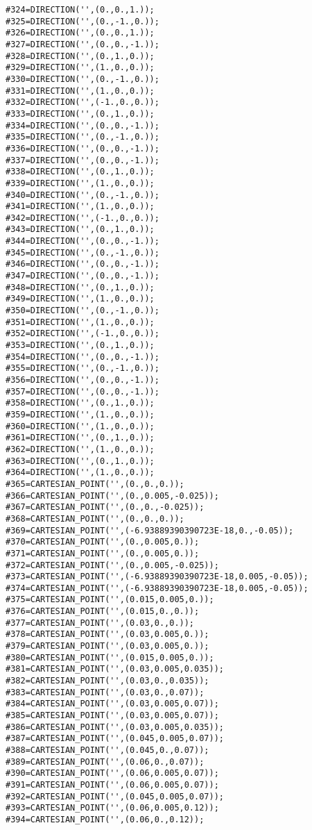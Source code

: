 \documentclass[a4paper,12pt]{article}
\begin{document}
\begin{lstlising}[language=C++]
\begin{lstlisting}[language=STEP]
#324=DIRECTION('',(0.,0.,1.));
#325=DIRECTION('',(0.,-1.,0.));
#326=DIRECTION('',(0.,0.,1.));
#327=DIRECTION('',(0.,0.,-1.));
#328=DIRECTION('',(0.,1.,0.));
#329=DIRECTION('',(1.,0.,0.));
#330=DIRECTION('',(0.,-1.,0.));
#331=DIRECTION('',(1.,0.,0.));
#332=DIRECTION('',(-1.,0.,0.));
#333=DIRECTION('',(0.,1.,0.));
#334=DIRECTION('',(0.,0.,-1.));
#335=DIRECTION('',(0.,-1.,0.));
#336=DIRECTION('',(0.,0.,-1.));
#337=DIRECTION('',(0.,0.,-1.));
#338=DIRECTION('',(0.,1.,0.));
#339=DIRECTION('',(1.,0.,0.));
#340=DIRECTION('',(0.,-1.,0.));
#341=DIRECTION('',(1.,0.,0.));
#342=DIRECTION('',(-1.,0.,0.));
#343=DIRECTION('',(0.,1.,0.));
#344=DIRECTION('',(0.,0.,-1.));
#345=DIRECTION('',(0.,-1.,0.));
#346=DIRECTION('',(0.,0.,-1.));
#347=DIRECTION('',(0.,0.,-1.));
#348=DIRECTION('',(0.,1.,0.));
#349=DIRECTION('',(1.,0.,0.));
#350=DIRECTION('',(0.,-1.,0.));
#351=DIRECTION('',(1.,0.,0.));
#352=DIRECTION('',(-1.,0.,0.));
#353=DIRECTION('',(0.,1.,0.));
#354=DIRECTION('',(0.,0.,-1.));
#355=DIRECTION('',(0.,-1.,0.));
#356=DIRECTION('',(0.,0.,-1.));
#357=DIRECTION('',(0.,0.,-1.));
#358=DIRECTION('',(0.,1.,0.));
#359=DIRECTION('',(1.,0.,0.));
#360=DIRECTION('',(1.,0.,0.));
#361=DIRECTION('',(0.,1.,0.));
#362=DIRECTION('',(1.,0.,0.));
#363=DIRECTION('',(0.,1.,0.));
#364=DIRECTION('',(1.,0.,0.));
#365=CARTESIAN_POINT('',(0.,0.,0.));
#366=CARTESIAN_POINT('',(0.,0.005,-0.025));
#367=CARTESIAN_POINT('',(0.,0.,-0.025));
#368=CARTESIAN_POINT('',(0.,0.,0.));
#369=CARTESIAN_POINT('',(-6.93889390390723E-18,0.,-0.05));
#370=CARTESIAN_POINT('',(0.,0.005,0.));
#371=CARTESIAN_POINT('',(0.,0.005,0.));
#372=CARTESIAN_POINT('',(0.,0.005,-0.025));
#373=CARTESIAN_POINT('',(-6.93889390390723E-18,0.005,-0.05));
#374=CARTESIAN_POINT('',(-6.93889390390723E-18,0.005,-0.05));
#375=CARTESIAN_POINT('',(0.015,0.005,0.));
#376=CARTESIAN_POINT('',(0.015,0.,0.));
#377=CARTESIAN_POINT('',(0.03,0.,0.));
#378=CARTESIAN_POINT('',(0.03,0.005,0.));
#379=CARTESIAN_POINT('',(0.03,0.005,0.));
#380=CARTESIAN_POINT('',(0.015,0.005,0.));
#381=CARTESIAN_POINT('',(0.03,0.005,0.035));
#382=CARTESIAN_POINT('',(0.03,0.,0.035));
#383=CARTESIAN_POINT('',(0.03,0.,0.07));
#384=CARTESIAN_POINT('',(0.03,0.005,0.07));
#385=CARTESIAN_POINT('',(0.03,0.005,0.07));
#386=CARTESIAN_POINT('',(0.03,0.005,0.035));
#387=CARTESIAN_POINT('',(0.045,0.005,0.07));
#388=CARTESIAN_POINT('',(0.045,0.,0.07));
#389=CARTESIAN_POINT('',(0.06,0.,0.07));
#390=CARTESIAN_POINT('',(0.06,0.005,0.07));
#391=CARTESIAN_POINT('',(0.06,0.005,0.07));
#392=CARTESIAN_POINT('',(0.045,0.005,0.07));
#393=CARTESIAN_POINT('',(0.06,0.005,0.12));
#394=CARTESIAN_POINT('',(0.06,0.,0.12));

\end{lstlisting}
\end{lstlising}
\end{document}
